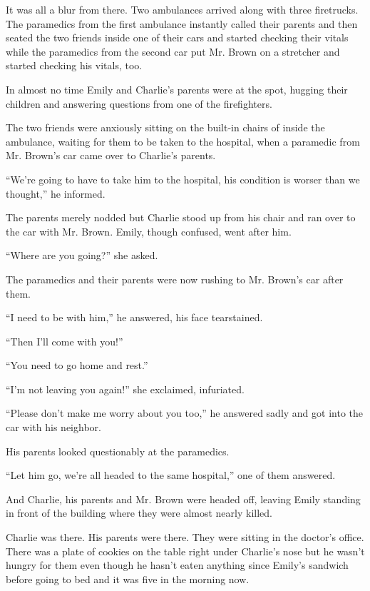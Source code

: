 It was all a blur from there. Two ambulances arrived along with three firetrucks. The   paramedics from the first ambulance instantly called their parents and then seated the two friends inside one of their cars and started checking their vitals while the paramedics from the second car put Mr. Brown on a stretcher and started checking his vitals, too.

In almost no time Emily and Charlie’s parents were at the spot, hugging their children and answering questions from one of the firefighters.

The two friends were anxiously sitting on the built-in chairs of inside the ambulance, waiting for them to be taken to the hospital, when a paramedic from Mr. Brown’s car came over to Charlie’s parents.

“We’re going to have to take him to the hospital, his condition is worser than we thought,” he informed.

The parents merely nodded but Charlie stood up from his chair and ran over to the car with Mr. Brown. Emily, though confused, went after him.

“Where are you going?” she asked.

The paramedics and their parents were now rushing to Mr. Brown’s car after them.

“I need to be with him,” he answered, his face tearstained.

“Then I’ll come with you!”

“You need to go home and rest.”

“I’m not leaving you again!” she exclaimed, infuriated.

“Please don’t make me worry about you too,” he answered sadly and got into the car with his neighbor.

His parents looked questionably at the paramedics.

“Let him go, we’re all headed to the same hospital,” one of them answered.

And Charlie, his parents and Mr. Brown were headed off, leaving Emily standing in front of the building where they were almost nearly killed.

\bigskip

Charlie was there. His parents were there. They were sitting in the doctor’s office. There was a plate of cookies on the table right under Charlie’s nose but he wasn’t hungry for them even though he hasn’t eaten anything since Emily’s sandwich before going to bed and it was five in the morning now.

